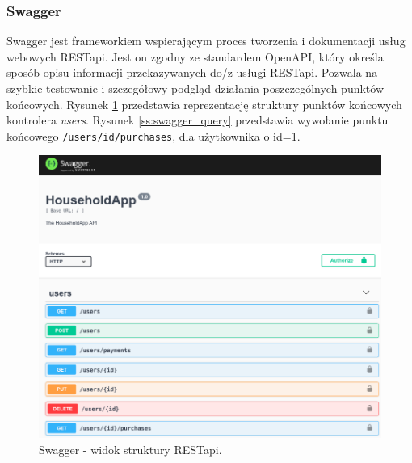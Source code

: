 
\subsubsection{Swagger} \label{section:swagger}

Swagger jest frameworkiem wspierającym proces tworzenia i dokumentacji usług webowych RESTapi. Jest on zgodny ze standardem OpenAPI, który określa sposób opisu informacji przekazywanych do/z usługi RESTapi. Pozwala na szybkie testowanie i szczegółowy podgląd działania poszczególnych punktów końcowych. Rysunek \ref{ss:swagger_gui} przedstawia reprezentację struktury punktów końcowych kontrolera \textit{users}. Rysunek \ref{ss:swagger_query} przedstawia wywołanie punktu końcowego \lstinline{/users/id/purchases}, dla użytkownika o id=1.

\begin{figure}[H]
  \centering
  \includegraphics[keepaspectratio,
    width=\linewidth,
    height=\dimexpr\textheight-2\baselineskip]{screenshots/swagger_1.png}
  \caption{Swagger - widok struktury RESTapi.}
  \label{ss:swagger_gui}
\end{figure}


